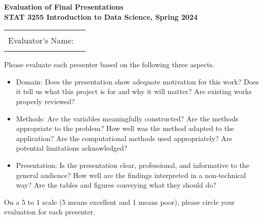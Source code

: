 \documentclass[12pt]{article}
\begin{document}

\begin{center}
  {\Large\bf Evaluation of Final Presentations\\[1ex]
    STAT 3255 Introduction to Data Science, Spring 2024}
\end{center}

\begin{center}
\begin{tabular}{|lr|}
\hline
& \\
{\Large Evaluator's Name:} \hfill & \phantom{xxxxxxxxxxxxxxxxxxxxxxxxxxxxxxxxxx} \\
& \\
\hline
\end{tabular}
\end{center}

\vspace{2cm}


Please evaluate each presenter based on the following three aspects.

\begin{itemize}
\item 
Domain:
Does the presentation show adequate motivation for this work? 
Does it tell us what this project is for and why it will matter?
Are existing works properly reviewed?

\item
Methods:
Are the variables meaningfully constructed?
Are the methods appropriate to the problem? 
How well was the method adapted to the application? 
Are the computational methods used appropriately?
Are potential limitations acknowledged?

\item
Presentation:
Is the presentation clear, professional, and informative
to the general audience?
How well are the findings interpreted in a non-technical way?
Are the tables and figures conveying what they should do?
\end{itemize}

\vspace{2cm}

On a 5 to 1 scale (5 means excellent and 1 means poor), please
circle your evaluation for each presenter.
\end{document}
